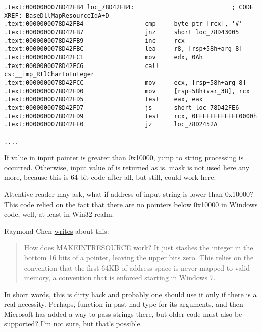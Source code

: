 \begin{lstlisting}[style=customasmx86]
.text:0000000078D42FB4 loc_78D42FB4:                           ; CODE XREF: BaseDllMapResourceIdA+D
.text:0000000078D42FB4                 cmp     byte ptr [rcx], '#'
.text:0000000078D42FB7                 jnz     short loc_78D43005
.text:0000000078D42FB9                 inc     rcx
.text:0000000078D42FBC                 lea     r8, [rsp+58h+arg_8]
.text:0000000078D42FC1                 mov     edx, 0Ah
.text:0000000078D42FC6                 call    cs:__imp_RtlCharToInteger
.text:0000000078D42FCC                 mov     ecx, [rsp+58h+arg_8]
.text:0000000078D42FD0                 mov     [rsp+58h+var_38], rcx
.text:0000000078D42FD5                 test    eax, eax
.text:0000000078D42FD7                 js      short loc_78D42FE6
.text:0000000078D42FD9                 test    rcx, 0FFFFFFFFFFFF0000h
.text:0000000078D42FE0                 jz      loc_78D2452A

....

\end{lstlisting}

If value in input pointer is greater than 0x10000, jump to string processing is occurred.
Otherwise, input value of  is returned as is.
 mask is not used here any more, because this is 64-bit code after all, but still,  could work here.

Attentive reader may ask, what if address of input string is lower than 0x10000?
This code relied on the fact that there are no pointers below 0x10000 in Windows code, well, at least in Win32 realm.

Raymond Chen \href{https://blogs.msdn.microsoft.com/oldnewthing/20130925-00/?p=3123}{writes} about this:

\begin{framed}
\begin{quotation}
How does MAKE­INT­RESOURCE work? It just stashes the integer in the bottom 16 bits of a pointer, leaving the upper bits zero. This relies on the convention that the first 64KB of address space is never mapped to valid memory, a convention that is enforced starting in Windows 7.
\end{quotation}
\end{framed}

In short words, this is dirty hack and probably one should use it only if there is a real necessity.
Perhaps,  function in past had  type for its arguments, and then Microsoft has added a way to pass strings there,
but older code must also be supported? I'm not sure, but that's possible.

